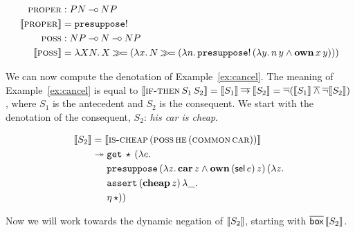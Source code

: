 \begin{align*}
  \textsc{proper} &: PN \mathbin{{-}\mkern-3.5mu{\circ}} NP \\
  \llbracket \textsc{proper} \rrbracket &= \mathtt{presuppose}! \\
  \textsc{poss} &: NP \mathbin{{-}\mkern-3.5mu{\circ}} N \mathbin{{-}\mkern-3.5mu{\circ}} NP \\
  \llbracket \textsc{poss} \rrbracket &= \lambda X N.\, X \mathbin{\gg\!=} (\lambda x.\, N \mathbin{\gg\!=} (\lambda n.\, \mathtt{presuppose}!\,(\lambda y.\, n\,y \land \textbf{own}\,x\,y)))
\end{align*}

We can now compute the denotation of Example~\ref{ex:cancel}. The meaning
of Example~\ref{ex:cancel} is equal to
$\llbracket \textsc{if-then}\,S_1\,S_2 \rrbracket = \llbracket S_1 \rrbracket \mathbin{\overline{\to}} \llbracket S_2 \rrbracket =
\mathop{\overline{\lnot}}(\llbracket S_1 \rrbracket \mathbin{\overline{\land}} \mathop{\overline{\lnot}} \llbracket S_2 \rrbracket)$, where $S_1$ is the antecedent and
$S_2$ is the consequent. We start with the denotation of the consequent,
$S_2$: \emph{his car is cheap}.

\begin{align*}
  \llbracket S_2 \rrbracket
  &= \llbracket \textsc{is-cheap}\,(\textsc{poss}\,\textsc{he}\,(\textsc{common}\,\textsc{car})) \rrbracket \\
  &\twoheadrightarrow \begin{aligned}[t]
    &\mathtt{get}\,\star\,(\lambda e.\,  \\
    &\mathtt{presuppose}\,(\lambda z.\, \textbf{car}\,z \land \textbf{own}\,(\textsf{sel}\,e)\,z)\,(\lambda z.\,  \\
    &\mathtt{assert}\,(\textbf{cheap}\,z)\,\lambda \_.\,  \\
    &\eta\,\star))
    \end{aligned}
\end{align*}

Now we will work towards the dynamic negation of $\llbracket S_2 \rrbracket$, starting with
$\overline{\textsf{box}}\,\llbracket S_2 \rrbracket$.

